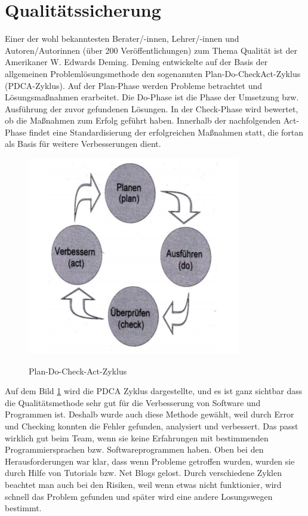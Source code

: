 \section{Qualitätssicherung}
Einer der wohl bekanntesten Berater/-innen, Lehrer/-innen und Autoren/Autorinnen (über 200
Veröffentlichungen) zum Thema Qualität ist der Amerikaner W. Edwards Deming. Deming
entwickelte auf der Basis der allgemeinen Problemlösungsmethode den sogenannten Plan-Do-CheckAct-Zyklus (PDCA-Zyklus). Auf der Plan-Phase werden Probleme betrachtet und Lösungsmaßnahmen
erarbeitet. Die Do-Phase ist die Phase der Umsetzung bzw. Ausführung der zuvor gefundenen
Lösungen. In der Check-Phase wird bewertet, ob die Maßnahmen zum Erfolg geführt haben.
Innerhalb der nachfolgenden Act-Phase findet eine Standardisierung der erfolgreichen Maßnahmen
statt, die fortan als Basis für weitere Verbesserungen dient.\cite{PDCA-Zyklus}
\bigbreak 
\begin{figure}
	\centering
	\includegraphics{./figures/pdca.png}
	\caption{ Plan-Do-Check-Act-Zyklus}
	\label{fig:pdca}
	\cite{PDCA-Zyklus}
\end{figure}

Auf dem Bild \ref{fig:pdca} wird die PDCA Zyklus dargestellte, und es ist ganz sichtbar dass die Qualitätsmethode sehr gut für die Verbesserung von Software und Programmen ist. Deshalb wurde auch diese Methode gewählt, weil durch Error und Checking konnten die Fehler gefunden, analysiert und verbessert. Das passt wirklich gut beim Team, wenn sie keine Erfahrungen mit bestimmenden Programmiersprachen bzw. Softwareprogrammen haben.
\bigbreak
Oben bei den Herausforderungen war klar, dass wenn Probleme getroffen wurden, wurden sie durch Hilfe von Tutorials bzw. Net Blogs gelost. Durch verschiedene Zyklen beachtet man auch bei den Risiken, weil wenn etwas nicht funktionier, wird schnell das Problem gefunden und später wird eine andere Losungswegen bestimmt.
 
